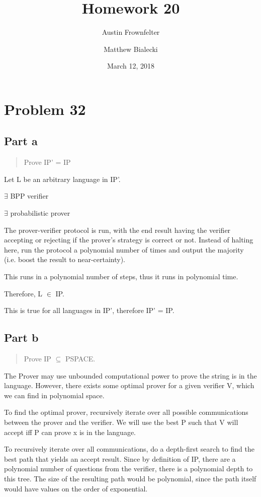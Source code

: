 \documentclass{article}
\title{Homework 20}
\author{Austin Frownfelter \and Matthew Bialecki}
\date{March 12, 2018}
\begin{document}
\maketitle

\section{Problem 32}
\subsection{Part a}
\begin{quote}
Prove IP' = IP
\end{quote}

Let L be an arbitrary language in IP'.

$\exists$ BPP verifier

$\exists$ probabilistic prover

The prover-verifier protocol is run, with the end result having the verifier accepting or rejecting if the prover's strategy is correct or not.  Instead of halting here, run the protocol a polynomial number of times and output the majority (i.e. boost the result to near-certainty). 

This runs in a polynomial number of steps, thus it runs in polynomial time.

Therefore, L $\in$ IP.

\medskip
This is true for all languages in IP', therefore IP' = IP.


\subsection{Part b}
\begin{quote}
Prove IP $\subseteq$ PSPACE.
\end{quote}

The Prover may use unbounded computational power to prove the string is in the language.  However, there exists some optimal prover for a given verifier V, which we can find in polynomial space.

To find the optimal prover, recursively iterate over all possible communications between the prover and the verifier.  We will use the best P such that V will accept iff P can prove x is in the language.

To recursively iterate over all communications, do a depth-first search to find the best path that yields an accept result.  Since by definition of IP, there are a polynomial number of questions from the verifier, there is a polynomial depth to this tree.  The size of the resulting path would be polynomial, since the path itself would have values on the order of exponential.
\end{document}

